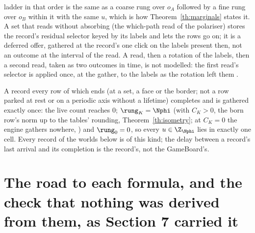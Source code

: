 \begin{definition}
ladder in that order is the same as a coarse rung over $o_A$ followed by
a fine rung over $o_B$ within it with the same $u$, which is how
Theorem~\ref{th:marginals} states it. A set that reads without
absorbing (the which-path read of the polariser)
stores the record's residual selector keyed by its labels and lets the
rows go on; it is a deferred offer, gathered at the record's one click
on the labels present then, not an outcome at the interval of the read.
A read, then a rotation of the labels, then a second read, taken as two outcomes in time, is not modelled: the first read's selector is applied once, at the gather, to the labels as the rotation left them \cite{engine}.
\end{definition}

\begin{lemma}\label{lem:one}
A record every row of which ends (at a set, a face or the border; not a
row parked at rest or on a periodic axis without a lifetime) completes
and is gathered exactly once: the live count reaches $0$; $\rung_K = \Nphi$
(with $C_K > 0$, the born row's norm up to the tables' rounding, Theorem~\ref{th:isometry}; at $C_K = 0$ the engine gathers nowhere, \cite[record 363]{log}) and $\rung_0 = 0$, so every
$u \in \Z_{\Nphi}$ lies in exactly one cell. Every record of the worlds below is of this kind; the delay between a record's last arrival and its completion is the record's, not the GameBoard's.
\end{lemma}

\section{The road to each formula, and the check that nothing was derived from them, as Section 7 carried it}\label{rec:roadcheck}

